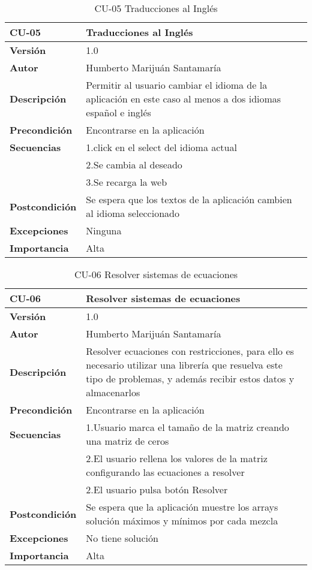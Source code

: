 \begin{table}[th!]
\begin{tabular}{  m{5cm}  m{7cm}  }
\hline \textbf{CU-05} & \textbf{Traducciones al Inglés} \\ 
\hline
\textbf{Versión} & 1.0\\
\textbf{Autor} & Humberto Marijuán Santamaría\\
\textbf{Descripción} & Permitir al usuario cambiar el idioma de la aplicación en este caso al menos a dos idiomas español e inglés \\
\textbf{Precondición} & Encontrarse en la aplicación\\
\textbf{Secuencias} & 1.click en el select del idioma actual\\ 
                    & 2.Se cambia al deseado \\
                    & 3.Se recarga la web \\
\textbf{Postcondición} & Se espera que los textos de la aplicación cambien al idioma seleccionado\\
\textbf{Excepciones} & Ninguna \\
\textbf{Importancia} & Alta\\
\hline
\end{tabular}
\caption{CU-05 Traducciones al Inglés}
\label{ref:tablacu_05}
\end{table}

\begin{table}[th!]
\begin{tabular}{  m{5cm}  m{7cm}  }
\hline \textbf{CU-06} & \textbf{Resolver sistemas de ecuaciones} \\ 
\hline
\textbf{Versión} & 1.0\\
\textbf{Autor} & Humberto Marijuán Santamaría\\
\textbf{Descripción} & Resolver ecuaciones con restricciones, para ello es necesario utilizar una librería que resuelva este tipo de problemas, y además recibir estos datos y almacenarlos \\
\textbf{Precondición} & Encontrarse en la aplicación\\
\textbf{Secuencias} & 1.Usuario marca el tamaño de la matriz creando una matriz de ceros\\
                    & 2.El usuario rellena los valores de la matriz configurando las ecuaciones a resolver \\
                    & 2.El usuario pulsa botón Resolver \\
\textbf{Postcondición} & Se espera que la aplicación muestre los arrays solución máximos y mínimos por cada mezcla\\
\textbf{Excepciones} & No tiene solución\\
\textbf{Importancia} & Alta\\
\hline
\end{tabular}
\caption{CU-06 Resolver sistemas de ecuaciones}
\label{ref:tablacu_06}
\end{table}

